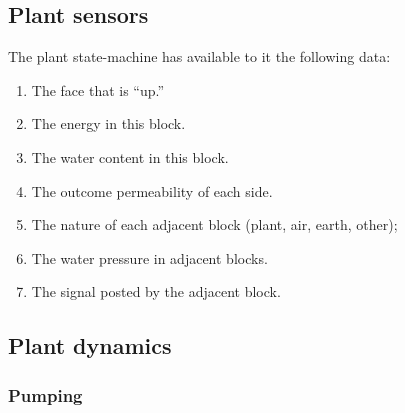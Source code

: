 \documentclass[10pt, a4paper, twocolumn]{article}
\begin{document}
\subsection{Plant sensors}

The plant state-machine has available to it the following data:
\begin{enumerate}
\item The face that is ``up.'' 
\item The energy in this block.
\item The water content in this block.
\item The outcome permeability of each side.
\item The nature of each adjacent block (plant, air, earth, other);
\item The water pressure in adjacent blocks.
\item The signal posted by the adjacent block.
\end{enumerate}

\subsection{Plant dynamics}

\subsubsection{Pumping}
\end{document}
